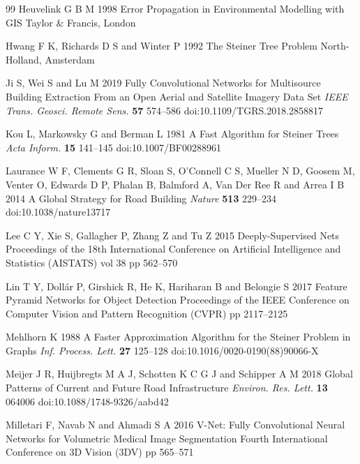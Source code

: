 \begin{thebibliography}{99}
 Heuvelink G B M 1998 Error Propagation in Environmental Modelling with {GIS} Taylor \& Francis, London

 Hwang F K, Richards D S and Winter P 1992 The {Steiner} Tree Problem North-Holland, Amsterdam

 Ji S, Wei S and Lu M 2019 Fully Convolutional Networks for Multisource Building Extraction From an Open Aerial and Satellite Imagery Data Set {\it IEEE Trans. Geosci. Remote Sens.} {\bf 57} 574--586 doi:10.1109/TGRS.2018.2858817

 Kou L, Markowsky G and Berman L 1981 A Fast Algorithm for {Steiner} Trees {\it Acta Inform.} {\bf 15} 141--145 doi:10.1007/BF00288961

 Laurance W F, Clements G R, Sloan S, O'Connell C S, Mueller N D, Goosem M, Venter O, Edwards D P, Phalan B, Balmford A, Van Der Ree R and Arrea I B 2014 A Global Strategy for Road Building {\it Nature} {\bf 513} 229--234 doi:10.1038/nature13717

 Lee C Y, Xie S, Gallagher P, Zhang Z and Tu Z 2015 Deeply-Supervised Nets Proceedings of the 18th International Conference on Artificial Intelligence and Statistics (AISTATS) vol 38 pp 562--570

 Lin T Y, Doll{\'a}r P, Girshick R, He K, Hariharan B and Belongie S 2017 Feature Pyramid Networks for Object Detection Proceedings of the IEEE Conference on Computer Vision and Pattern Recognition (CVPR) pp 2117--2125

 Mehlhorn K 1988 A Faster Approximation Algorithm for the {Steiner} Problem in Graphs {\it Inf. Process. Lett.} {\bf 27} 125--128 doi:10.1016/0020-0190(88)90066-X

 Meijer J R, Huijbregts M A J, Schotten K C G J and Schipper A M 2018 Global Patterns of Current and Future Road Infrastructure {\it Environ. Res. Lett.} {\bf 13} 064006 doi:10.1088/1748-9326/aabd42

 Milletari F, Navab N and Ahmadi S A 2016 {V-Net}: Fully Convolutional Neural Networks for Volumetric Medical Image Segmentation Fourth International Conference on 3D Vision (3DV) pp 565--571


\end{thebibliography}
